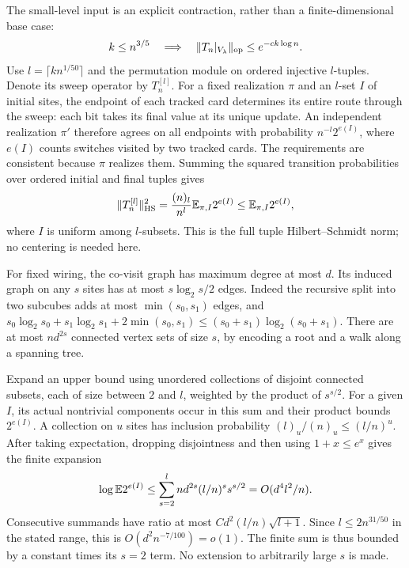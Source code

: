 The small-level input is an explicit contraction, rather than a
finite-dimensional base case:
\begin{equation}\label{rec:perspective-small-level}
 k\le n^{3/5}\quad\Longrightarrow\quad
 \|T_n|_{V_\lambda}\|_{\mathrm{op}}\le e^{-c k\log n}.
\end{equation}
Use $l=\lceil k n^{1/50}\rceil$ and the permutation module on ordered
injective $l$-tuples.  Denote its sweep operator by $T_n^{[l]}$.
For a fixed realization $\pi$ and an $l$-set $I$ of initial sites,
the endpoint of each tracked card determines its entire route through
the sweep: each bit takes its final value at its unique update.
An independent realization $\pi'$ therefore agrees on all endpoints
with probability $n^{-l}2^{e(I)}$, where $e(I)$ counts switches
visited by two tracked cards.  The requirements are consistent
because $\pi$ realizes them.  Summing the squared transition
probabilities over ordered initial and final tuples gives
\begin{equation}\label{rec:perspective-tuple-HS}
 \|T_n^{[l]}\|_{\mathrm{HS}}^2
 =\frac{(n)_l}{n^l}\mathbb E_{\pi,I}2^{e(I)}
 \le\mathbb E_{\pi,I}2^{e(I)},
\end{equation}
where $I$ is uniform among $l$-subsets.  This is the full tuple
Hilbert--Schmidt norm; no centering is needed here.

For fixed wiring, the co-visit graph has maximum degree at most $d$.
Its induced graph on any $s$ sites has at most $s\log_2s/2$ edges.
Indeed the recursive split into two subcubes adds at most
$\min(s_0,s_1)$ edges, and
$s_0\log_2s_0+s_1\log_2s_1+2\min(s_0,s_1)
\le(s_0+s_1)\log_2(s_0+s_1)$.
There are at most $nd^{2s}$ connected vertex sets of size $s$, by
encoding a root and a walk along a spanning tree.

Expand an upper bound using unordered collections of disjoint
connected subsets, each of size between $2$ and $l$, weighted by
the product of $s^{s/2}$.  For a given $I$, its actual nontrivial
components occur in this sum and their product bounds $2^{e(I)}$.
A collection on $u$ sites has inclusion probability
$(l)_u/(n)_u\le(l/n)^u$.  After taking expectation, dropping
disjointness and then using $1+x\le e^x$ gives the finite expansion
\begin{equation}\label{rec:perspective-finite-encounters}
 \log\mathbb E 2^{e(I)}
 \le\sum_{s=2}^{l}nd^{2s}(l/n)^s s^{s/2}
 =O(d^4l^2/n).
\end{equation}
Consecutive summands have ratio at most $C d^2(l/n)\sqrt{l+1}$.  Since
$l\le2n^{31/50}$ in the stated range, this is
$O(d^2n^{-7/100})=o(1)$.  The finite sum is thus bounded by a
constant times its $s=2$ term.  No extension to arbitrarily large
$s$ is made.

